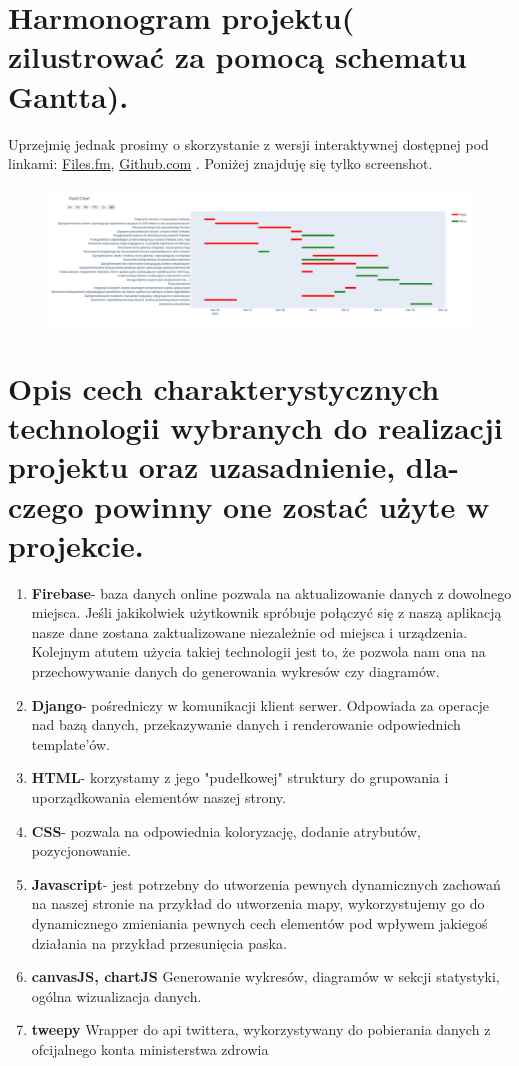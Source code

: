 \documentclass[13pt]{article}
\begin{document}
\section{Harmonogram projektu( zilustrować za pomocą schematu Gantta).}
Uprzejmię jednak prosimy o skorzystanie z wersji interaktywnej dostępnej pod linkami:
\color{blue}
\href{https://files.fm/u/nexkde7b#/view/nrchhfty}{Files.fm},
\href{https://github.com/sqoshi/team-programming-project/tree/master/documentation/gantt.html}{Github.com}
\color{black}. Poniżej znajduję się tylko screenshot.
\begin{figure}[!htb]
 \hspace*{-3.3cm}\includegraphics[scale=0.3]{gantt.png}
\end{figure}
\section{Opis cech charakterystycznych technologii wybranych do realizacji projektu oraz uzasadnienie, dla-
czego powinny one zostać użyte w projekcie.}


\begin{enumerate}
\item {\bf Firebase}- baza danych online pozwala na aktualizowanie danych z dowolnego miejsca. Jeśli jakikolwiek użytkownik spróbuje połączyć się z naszą aplikacją nasze dane zostana zaktualizowane niezależnie od miejsca i urządzenia. \\Kolejnym atutem użycia takiej technologii jest to, że pozwola nam ona na przechowywanie danych do generowania wykresów czy diagramów.
\item {\bf Django}- pośredniczy w komunikacji klient serwer. Odpowiada za operacje nad bazą danych, przekazywanie danych i renderowanie odpowiednich template'ów.
\item {\bf HTML}- korzystamy z jego "pudełkowej" struktury do grupowania i uporządkowania elementów naszej strony.
\item {\bf CSS}- pozwala na odpowiednia koloryzację, dodanie atrybutów, pozycjonowanie.
\item {\bf Javascript}- jest potrzebny do utworzenia pewnych dynamicznych zachowań na naszej stronie na przykład do utworzenia mapy, wykorzystujemy go do dynamicznego zmieniania pewnych cech elementów pod wpływem jakiegoś działania na przykład przesunięcia paska.
\item {\bf canvasJS, chartJS} Generowanie wykresów, diagramów w sekcji statystyki, ogólna wizualizacja danych.
\item {\bf tweepy} Wrapper do api twittera, wykorzystywany do pobierania danych z ofcijalnego konta ministerstwa zdrowia
\end{enumerate}
\end{document}
